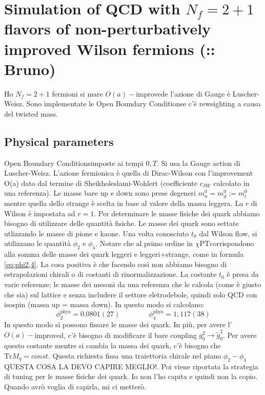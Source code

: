 \documentclass[12pt,a4paper,openright]{article}
\newcommand{\colr}{\textcolor{BrickRed}}
\newcommand{\cpt}{$\chi\text{PT}$}
\newcommand{\oai}{$O(a)-$improved}
\newcommand{\obc}{Open Boundary Conditions}
\newcommand{\tr}{\text{Tr}}
\begin{document}
\section{Simulation of QCD with $N_f = 2+1$ flavors of non-perturbatively improved Wilson fermions (:: Bruno)}
Ho $N_f = 2+1$ fermioni si mare \oai e l'azione di Gauge è Luscher-Weisz. Sono implementate le \obc e c'è reweighting a causa del twisted mass.
\subsection{Physical parameters}
\obc imposte ai tempi $0,T$. Si usa la Gauge action di Luscher-Weisz.
L'azione fermionica è quella di Dirac-Wilson con l'improvement O(a) dato dal termine di Sheikholeslami-Wohlert (coefficiente $c_{SW}$ calcolato in una referenza).
Le masse bare up e down sono prese degeneri $m_u^0 = m_d^0 := m_l^0$ mentre quella dello strange è scelta in base al valore della massa leggera. La $r$ di Wilson è impostata ad $r = 1$.
\newline
Per determinare le masse fisiche dei quark abbiamo bisogno di utilizzare delle quantità fisiche.
Le masse dei quark sono settate utlizzando le masse di pione e kaone.
Una volta conosciuto $t_0$ dal Wilson flow, si utilizzano le quantità $\phi_2$ e $\phi_4$. Notare che al primo ordine in \cpt corrispondono alla somma delle masse dei quark leggeri e leggeri+strange, come in formula \ref{eq:phi2,4}.
La cosa positiva è che facendo così non abbiamo bisogno di estrapolazioni chirali o di costanti di rinormalizzazione.
La costante $t_0$ è presa da varie referenze; le masse dei mesoni da una referenza che le calcola (come è giusto che sia) sul lattice e senza includere il settore eletrodebole, quindi solo QCD con isospin (massa up = massa down).
In questo modo si calcolano:
\begin{equation*}
  \phi_2^{\text{phys}} = 0.0801(27) \qquad \qquad \phi_4^{\text{phys}} = 1,117(38)
\end{equation*}
In questo modo si possono fissare le masse dei quark.
\newline\newline
In più, per avere l'\oai, c'è bisogno di modificare il bare coupling $g_0^2 \rightarrow \tilde g_0^2$. Per avere questo costante mentre si cambia la massa dei quark, c'è bisogno che $\tr M_q = const$.
Questa richiesta fissa una traiettoria chirale nel piano $\phi_2 - \phi_4$ \colr{QUESTA COSA LA DEVO CAPIRE MEGLIO!}.
\colr{Poi viene riportata la strategia di tuning per le masse fisiche dei quark. Io non l'ho capita e quindi non la copio. Quando avrò voglia di capirla, mi ci metterò.}
\end{document}
